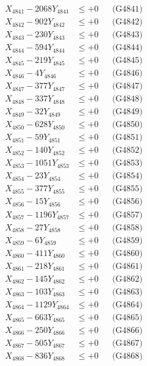 \documentclass[a4paper,10pt]{article}
\begin{document}
{\begin{align}
\allowbreak
X_{4841} - 2068Y_{4841} &\leq +0 && \text{(G4841)} \\
X_{4842} - 902Y_{4842} &\leq +0 && \text{(G4842)} \\
X_{4843} - 230Y_{4843} &\leq +0 && \text{(G4843)} \\
X_{4844} - 594Y_{4844} &\leq +0 && \text{(G4844)} \\
X_{4845} - 219Y_{4845} &\leq +0 && \text{(G4845)} \\
X_{4846} - 4Y_{4846} &\leq +0 && \text{(G4846)} \\
X_{4847} - 377Y_{4847} &\leq +0 && \text{(G4847)} \\
X_{4848} - 337Y_{4848} &\leq +0 && \text{(G4848)} \\
X_{4849} - 32Y_{4849} &\leq +0 && \text{(G4849)} \\
X_{4850} - 628Y_{4850} &\leq +0 && \text{(G4850)} \\
\allowbreak
X_{4851} - 59Y_{4851} &\leq +0 && \text{(G4851)} \\
X_{4852} - 140Y_{4852} &\leq +0 && \text{(G4852)} \\
X_{4853} - 1051Y_{4853} &\leq +0 && \text{(G4853)} \\
X_{4854} - 23Y_{4854} &\leq +0 && \text{(G4854)} \\
X_{4855} - 377Y_{4855} &\leq +0 && \text{(G4855)} \\
X_{4856} - 15Y_{4856} &\leq +0 && \text{(G4856)} \\
X_{4857} - 1196Y_{4857} &\leq +0 && \text{(G4857)} \\
X_{4858} - 27Y_{4858} &\leq +0 && \text{(G4858)} \\
X_{4859} - 6Y_{4859} &\leq +0 && \text{(G4859)} \\
X_{4860} - 411Y_{4860} &\leq +0 && \text{(G4860)} \\
\allowbreak
X_{4861} - 218Y_{4861} &\leq +0 && \text{(G4861)} \\
X_{4862} - 145Y_{4862} &\leq +0 && \text{(G4862)} \\
X_{4863} - 103Y_{4863} &\leq +0 && \text{(G4863)} \\
X_{4864} - 1129Y_{4864} &\leq +0 && \text{(G4864)} \\
X_{4865} - 663Y_{4865} &\leq +0 && \text{(G4865)} \\
X_{4866} - 250Y_{4866} &\leq +0 && \text{(G4866)} \\
X_{4867} - 505Y_{4867} &\leq +0 && \text{(G4867)} \\
X_{4868} - 836Y_{4868} &\leq +0 && \text{(G4868)} \\

\end{align}}
\end{document}
